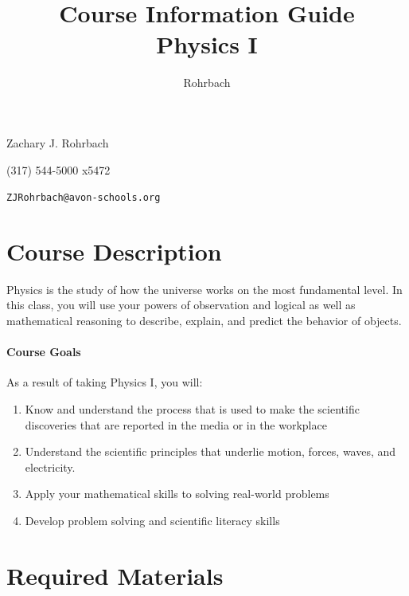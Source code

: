 \documentclass[10pt]{exam}
\title{Course Information Guide \\ Physics I}
\author{Rohrbach}
\newcommand{\phonenumber}{(317) 544-5000 x5472}
\begin{document}
\maketitle

\noindent Zachary J. Rohrbach

\noindent \phonenumber

\noindent \texttt{ZJRohrbach@avon-schools.org}

\vspace{-0.5em}


\section*{Course Description}

Physics is the study of how the universe works on the most fundamental level.  In this 
class, you will use your powers of observation and logical as well as mathematical 
reasoning to describe, explain, and predict the behavior of objects.

\paragraph{Course Goals} 
As a result of taking Physics I, you will:

\begin{enumerate}
	\item Know and understand the process that is used to make the scientific discoveries that 
				are reported in the media or in the workplace
	\item Understand the scientific principles that underlie motion, forces, waves, and electricity.
	\item Apply your mathematical skills to solving real-world problems
	\item Develop problem solving and scientific literacy skills
\end{enumerate}

\section*{Required Materials}
\end{document}
